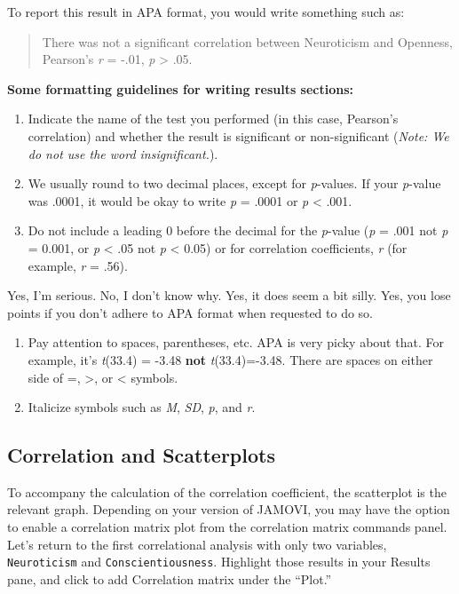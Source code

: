 \documentclass[
]{book}
\begin{document}
To report this result in APA format, you would write something such as:

\begin{quote}
There was not a significant correlation between Neuroticism and Openness, Pearson's \emph{r} = -.01, \emph{p} \textgreater{} .05.
\end{quote}

\textbf{Some formatting guidelines for writing results sections:}

\begin{enumerate}
\def\labelenumi{\alph{enumi}.}
\item
  Indicate the name of the test you performed (in this case, Pearson's correlation) and whether the result is significant or non-significant (\emph{Note: We do not use the word insignificant.}).
\item
  We usually round to two decimal places, except for \emph{p}-values. If your \emph{p}-value was .0001, it would be okay to write \emph{p} = .0001 or \emph{p} \textless{} .001.
\item
  Do not include a leading 0 before the decimal for the \emph{p}-value (\emph{p} = .001 not \emph{p} = 0.001, or \emph{p} \textless{} .05 not \emph{p} \textless{} 0.05) or for correlation coefficients, \emph{r} (for example, \emph{r} = .56).
\end{enumerate}

Yes, I'm serious. No, I don't know why. Yes, it does seem a bit silly. Yes, you lose points if you don't adhere to APA format when requested to do so.

\begin{enumerate}
\def\labelenumi{\alph{enumi}.}
\setcounter{enumi}{3}
\item
  Pay attention to spaces, parentheses, etc. APA is very picky about that. For example, it's \emph{t}(33.4) = -3.48 \textbf{not} \emph{t}(33.4)=-3.48. There are spaces on either side of =, \textgreater, or \textless{} symbols.
\item
  Italicize symbols such as \emph{M}, \emph{SD}, \emph{p}, and \emph{r}.
\end{enumerate}

\hypertarget{correlation-and-scatterplots-2}{%
\subsection{Correlation and Scatterplots}\label{correlation-and-scatterplots-2}}

To accompany the calculation of the correlation coefficient, the scatterplot is the relevant graph. Depending on your version of JAMOVI, you may have the option to enable a correlation matrix plot from the correlation matrix commands panel. Let's return to the first correlational analysis with only two variables, \texttt{Neuroticism} and \texttt{Conscientiousness}. Highlight those results in your Results pane, and click to add {Correlation matrix } under the ``Plot.''
\end{document}
